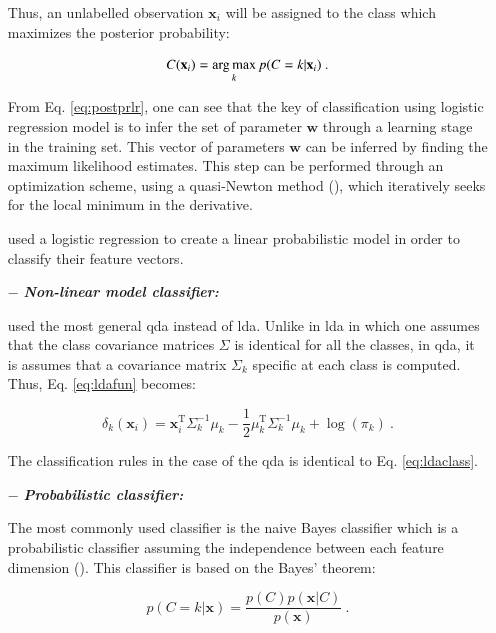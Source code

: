 \begin{enumerate}[leftmargin=*]
Thus, an unlabelled observation $\mathbf{x}_i$ will be assigned to the class which maximizes the posterior probability:

\begin{equation}
	C(\mathbf{x}_i) = \operatorname*{arg\,max}_k p(C=k|\mathbf{x}_i) \ .
	\label{eq:posprobreg}
\end{equation}

From Eq. \ref{eq:postprlr}, one can see that the key of classification using logistic regression model is to infer the set of parameter $\mathbf{w}$ through a learning stage in the training set. This vector of parameters $\mathbf{w}$ can be inferred by finding the maximum likelihood estimates. This step can be performed through an optimization scheme, using a quasi-Newton method (\cite{Byrd1995}), which iteratively seeks for the local minimum in the derivative.

\cite{Kelm2007,Puech2009} used a logistic regression to create a linear probabilistic model in order to classify their feature vectors.

\item[$-$] \textbf{\textit{Non-linear model classifier:}} 

\cite{Viswanath2012} used the most general \acf{qda} instead of \ac{lda}. Unlike in \ac{lda} in which one assumes that the class covariance matrices $\Sigma$ is identical for all the classes, in \ac{qda}, it is assumes that a covariance matrix $\Sigma_k$ specific at each class is computed. Thus, Eq. \ref{eq:ldafun} becomes:

\begin{equation}
	\delta_{k}(\mathbf{x}_i) = \mathbf{x}_i^{\text{T}} \Sigma_{k}^{-1} \mu_k - \frac{1}{2} \mu_{k}^{\text{T}} \Sigma_{k}^{-1} \mu_k + \log (\pi_k) \ .
	\label{eq:qdafun}
\end{equation}

The classification rules in the case of the \ac{qda} is identical to Eq. \ref{eq:ldaclass}.

\item[$-$] \textbf{\textit{Probabilistic classifier:}}

The most commonly used classifier is the naive Bayes classifier which is a probabilistic classifier assuming the independence between each feature dimension (\cite{Rish2001}). This classifier is based on the Bayes' theorem:

\begin{equation}
	p(C=k|\mathbf{x}) = \frac{p(C)p(\mathbf{x}|C)}{p(\mathbf{x})} \ .
	\label{eq:bayth}
\end{equation}


\end{enumerate}
